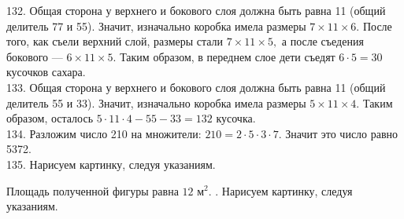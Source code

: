 \documentclass[12pt]{article}
\begin{document}
132. Общая сторона у верхнего и бокового слоя должна быть равна 11 (общий делитель 77 и 55). Значит, изначально коробка имела размеры $7\times11\times6.$ После того, как съели верхний слой, размеры стали $7\times11\times5,$ а после съедения бокового --- $6\times11\times5.$ Таким образом, в переднем слое дети съедят $6\cdot5=30$ кусочков сахара.\\
133. Общая сторона у верхнего и бокового слоя должна быть равна 11 (общий делитель 55 и 33). Значит, изначально коробка имела размеры $5\times11\times4.$ Таким образом, осталось $5\cdot11\cdot4-55-33=132$ кусочка.\\
134. Разложим число 210 на множители: $210=2\cdot5\cdot3\cdot7.$ Значит это число равно 5372.\\
135. Нарисуем картинку, следуя указаниям.
\begin{center}
\begin{figure}[ht!]
\end{figure}
\end{center}
Площадь полученной фигуры равна $12\text{ м}^2.$
\newpage{}. Нарисуем картинку, следуя указаниям.
\begin{center}
\begin{figure}[ht!]
\end{figure}
\end{center}
\end{document}
